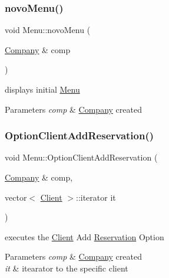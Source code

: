 \subsubsection{\texorpdfstring{novo\+Menu()}{novoMenu()}}
{\footnotesize\ttfamily void Menu\+::novo\+Menu (\begin{DoxyParamCaption}\item[{\hyperlink{class_company}{Company} \&}]{comp }\end{DoxyParamCaption})}



displays initial \hyperlink{class_menu}{Menu} 


\begin{DoxyParams}{Parameters}
{\em comp} & \hyperlink{class_company}{Company} created \\
\hline
\end{DoxyParams}
\hypertarget{class_menu_aec8d85a14f978bcbbd80b68dca50c8b7}{}\label{class_menu_aec8d85a14f978bcbbd80b68dca50c8b7} 
\subsubsection{\texorpdfstring{Option\+Client\+Add\+Reservation()}{OptionClientAddReservation()}}
{\footnotesize\ttfamily void Menu\+::\+Option\+Client\+Add\+Reservation (\begin{DoxyParamCaption}\item[{\hyperlink{class_company}{Company} \&}]{comp,  }\item[{vector$<$ \hyperlink{class_client}{Client} $>$\+::iterator}]{it }\end{DoxyParamCaption})}



executes the \hyperlink{class_client}{Client} Add \hyperlink{class_reservation}{Reservation} Option 


\begin{DoxyParams}{Parameters}
{\em comp} & \hyperlink{class_company}{Company} created\\
\hline
{\em it} & itearator to the specific client \\
\hline
\end{DoxyParams}
\hypertarget{class_menu_a1b5046f15756bbb55fbad646c77019a7}{}\label{class_menu_a1b5046f15756bbb55fbad646c77019a7} 
